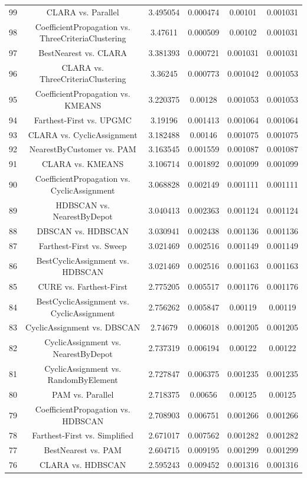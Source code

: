 \documentclass[a4paper,10pt]{article}
\begin{document}
\begin{landscape}
\begin{table}[!htp]
\begin{tabular}{cccccc}
99&CLARA vs. Parallel&3.495054&0.000474&0.00101&0.001031\\
98&CoefficientPropagation vs. ThreeCriteriaClustering&3.47611&0.000509&0.00102&0.001031\\
97&BestNearest vs. CLARA&3.381393&0.000721&0.001031&0.001031\\
96&CLARA vs. ThreeCriteriaClustering&3.36245&0.000773&0.001042&0.001053\\
95&CoefficientPropagation vs. KMEANS&3.220375&0.00128&0.001053&0.001053\\
94&Farthest-First vs. UPGMC&3.19196&0.001413&0.001064&0.001064\\
93&CLARA vs. CyclicAssignment&3.182488&0.00146&0.001075&0.001075\\
92&NearestByCustomer vs. PAM&3.163545&0.001559&0.001087&0.001087\\
91&CLARA vs. KMEANS&3.106714&0.001892&0.001099&0.001099\\
90&CoefficientPropagation vs. CyclicAssignment&3.068828&0.002149&0.001111&0.001111\\
89&HDBSCAN vs. NearestByDepot&3.040413&0.002363&0.001124&0.001124\\
88&DBSCAN vs. HDBSCAN&3.030941&0.002438&0.001136&0.001136\\
87&Farthest-First vs. Sweep&3.021469&0.002516&0.001149&0.001149\\
86&BestCyclicAssignment vs. HDBSCAN&3.021469&0.002516&0.001163&0.001163\\
85&CURE vs. Farthest-First&2.775205&0.005517&0.001176&0.001176\\
84&BestCyclicAssignment vs. CyclicAssignment&2.756262&0.005847&0.00119&0.00119\\
83&CyclicAssignment vs. DBSCAN&2.74679&0.006018&0.001205&0.001205\\
82&CyclicAssignment vs. NearestByDepot&2.737319&0.006194&0.00122&0.00122\\
81&CyclicAssignment vs. RandomByElement&2.727847&0.006375&0.001235&0.001235\\
80&PAM vs. Parallel&2.718375&0.00656&0.00125&0.00125\\
79&CoefficientPropagation vs. HDBSCAN&2.708903&0.006751&0.001266&0.001266\\
78&Farthest-First vs. Simplified&2.671017&0.007562&0.001282&0.001282\\
77&BestNearest vs. PAM&2.604715&0.009195&0.001299&0.001299\\
76&CLARA vs. HDBSCAN&2.595243&0.009452&0.001316&0.001316\\

\end{tabular}
\end{table}
\end{landscape}
\end{document}
